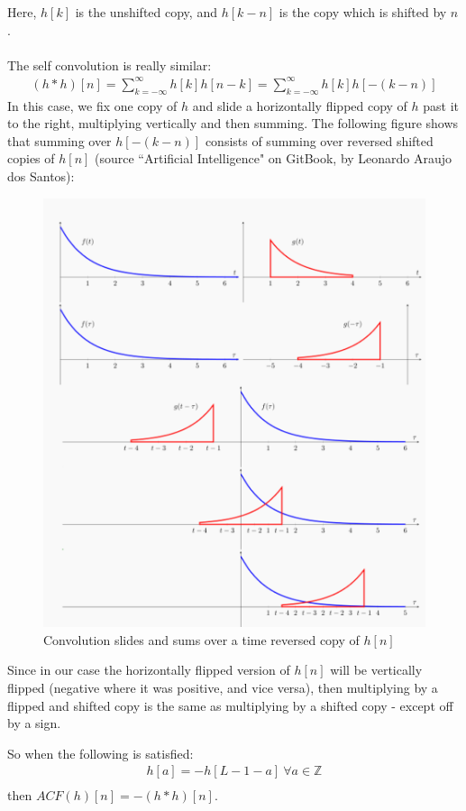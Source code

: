 \documentclass[a4paper]{article}
\begin{document}
Here, $h[k]$ is the unshifted copy, and $h[k-n]$ is the copy which is shifted by $n$.
\\\\
The self convolution is really similar:
\begin{align*}
(h*h)[n] = \sum_{k=-\infty}^{\infty}h[k]h[n-k] =  \sum_{k=-\infty}^{\infty}h[k]h[-(k-n)]
\end{align*}
In this case, we fix one copy of $h$ and slide a horizontally flipped copy of $h$ past it to the right, multiplying vertically and then summing.
\clearpage
The following figure shows that summing over $h[-(k-n)]$ consists of summing over reversed shifted copies of $h[n]$ (source ``Artificial Intelligence" on GitBook, by Leonardo Araujo dos Santos):
\begin{center}
\begin{figure}[h]
\includegraphics[scale=0.4]{TimeFlipConv.png}
\caption{Convolution slides and sums over a time reversed copy of $h[n]$}
\end{figure}
\end{center}
Since in our case the horizontally flipped version of $h[n]$ will be vertically flipped (negative where it was positive, and vice versa), then multiplying by a flipped and shifted copy is the same as multiplying by a shifted copy - except off by a sign.
\begin{tcolorbox}
So when the following is satisfied:
\begin{align*}
h[a] = -h[L-1 - a]~\forall a \in \mathbb{Z} \\
\end{align*}
then $ACF(h)[n] = -(h*h)[n]$.
\end{tcolorbox}
\clearpage
\end{document}
